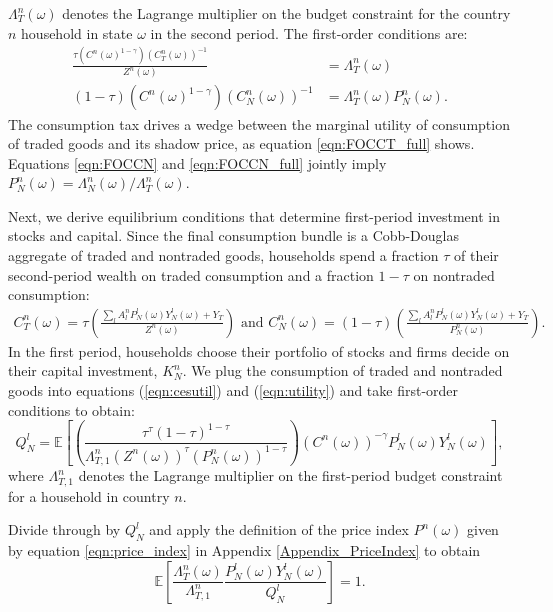 $\Lambda_T^n(\omega)$ denotes the Lagrange multiplier on the budget
constraint for the country $n$ household in state $\omega$ in the
second period. The first-order conditions are:
\begin{align}
  \frac{\tau \left( C^n(\omega)^{1 - \gamma} \right) 
  \left( C_T^n(\omega) \right)^{-1}}{Z^n(\omega)}
  & = \Lambda^n_T(\omega) \label{eqn:FOCCT_full}\\ 
  (1 - \tau) \left( C^n(\omega)^{1 - \gamma} \right) 
  \left( C_N^n(\omega) \right)^{-1} & = \Lambda^n_T(\omega) P^n_N(\omega).
                                      \label{eqn:FOCCN_full}
\end{align}
The consumption tax drives a wedge between the marginal utility of
consumption of traded goods and its shadow price, as equation
\eqref{eqn:FOCCT_full} shows. Equations \eqref{eqn:FOCCN} and
\eqref{eqn:FOCCN_full} jointly imply
$P_N^n(\omega)= \Lambda_N^n(\omega) / \Lambda^n_T(\omega)$.

Next, we derive equilibrium conditions that determine first-period
investment in stocks and capital. Since the final consumption bundle
is a Cobb-Douglas aggregate of traded and nontraded goods, households
spend a fraction $\tau$ of their second-period wealth on traded
consumption and a fraction $1 - \tau$ on nontraded consumption:
\begin{align*}
  C^n_T(\omega) = \tau
  \left( \frac{\sum_l A^n_l P^l_N(\omega) Y^l_N(\omega) + 
  Y_T}{Z^n(\omega)} \right) \text{ and }
  C^n_N(\omega) = (1 - \tau)
  \left( \frac{\sum_l A^n_l P^l_N(\omega) Y^l_N(\omega) + 
  Y_T}{P^n_N(\omega)} \right).
\end{align*}
In the first period, households choose their portfolio of stocks and
firms decide on their capital investment, $K^n_N$. We plug the
consumption of traded and nontraded goods into equations
(\ref{eqn:cesutil}) and (\ref{eqn:utility}) and take first-order
conditions to obtain:
\begin{equation*}
  Q^l_N
  = \mathbb{E}\left[
    \left( \frac{\tau^\tau (1 - \tau)^{1 -\tau}}{\Lambda_{T, 1}^n \left( Z^n(\omega) \right)^{\tau}
        \left(P^n_N(\omega) \right)^{1 - \tau}} \right)
    \left( C^n(\omega) \right)^{- \gamma} P^l_N(\omega) Y^l_N(\omega) \right],
\end{equation*}
where $\Lambda_{T, 1}^n$ denotes the Lagrange multiplier on the
first-period budget constraint for a household in country $n$.


Divide through by $Q^l_N$ and apply the definition of the price index
$P^n(\omega)$ given by equation \eqref{eqn:price_index} in Appendix
\ref{Appendix_PriceIndex} to obtain
\begin{equation}
  \mathbb{E}\left[ \frac{\Lambda_T^n(\omega)}{\Lambda_{T, 1}^n} 
    \frac{P^l_N(\omega) Y^l_N(\omega)}{Q_N^l} \right] = 1.
  \label{eqn:FOC_Stock}
\end{equation}

